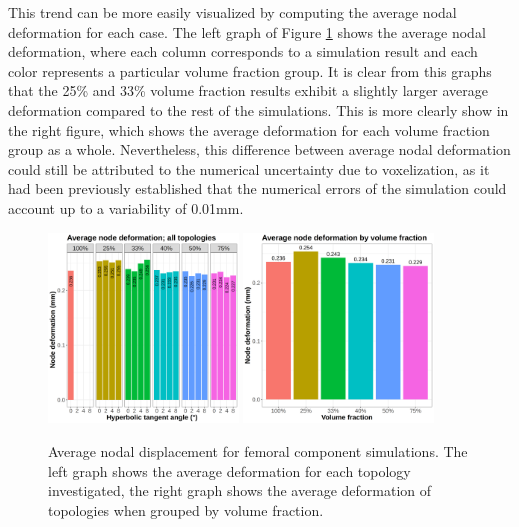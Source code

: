 \documentclass[../main.tex]{subfiles}
\begin{document}
This trend can be more easily visualized by computing the average nodal deformation for each case. The left graph of Figure \ref{fig:disp_averages} shows the average nodal deformation, where each column corresponds to a simulation result and each color represents a particular volume fraction group. It is clear from this graphs that the 25\% and 33\% volume fraction results exhibit a slightly larger average deformation compared to the rest of the simulations. This is more clearly show in the right figure, which shows the average deformation for each volume fraction group as a whole. Nevertheless, this difference between average nodal deformation could still be attributed to the numerical uncertainty due to voxelization, as it had been previously established that the numerical errors of the simulation could account up to a variability of 0.01mm.

\begin{figure}[h!]
  \includegraphics[width=0.45\textwidth]{images/results/plots/femoral/displacement/femoral_average.png}
  \hfill 
  \includegraphics[width=0.45\textwidth]{images/results/plots/femoral/displacement/femoral_average_group.png}
  \caption{Average nodal displacement for femoral component simulations. The left graph shows the average deformation for each topology investigated, the right graph shows the average deformation of topologies when grouped by volume fraction.}
  \label{fig:disp_averages}
\end{figure}
\end{document}
